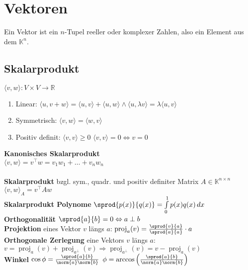 \documentclass[german, 6pt]{latex4ei/latex4ei_sheet}
\newcommand{\enbrace}[1]{\ensuremath{\left(#1\right)}}
\DeclareMathOperator{\proj}{proj}
\begin{document}
\section{Vektoren}
\begin{minipage}{\columnwidth}
Ein Vektor ist ein $n$-Tupel reeller oder komplexer Zahlen, also ein Element aus dem $\mathbb K^n$.
\subsection{Skalarprodukt}
$\langle v,w \rangle: V\times V \rightarrow \mathbb R$ 
	\begin{enumerate}\itemsep0pt
	\item Linear: $\langle u,v+w \rangle=\langle u,v \rangle + \langle u,w \rangle \land \langle u,\lambda v \rangle = \lambda \langle u, v \rangle$ 
	\item Symmetrisch: $\langle v,w \rangle=\langle w,v \rangle$
	\item Positiv definit: $\langle v,v \rangle\ge0$  \qquad $\langle v,v \rangle=0 \Leftrightarrow v=0$
	\end{enumerate} 
\textbf{Kanonisches Skalarprodukt} \\
$\langle v,w \rangle=v^\top  w=v_1w_1+\dots+v_nw_n$\\ \\
\textbf{Skalarprodukt} bzgl. sym., quadr. und positiv definiter Matrix $A\in \mathbb K^{n\times n}$\\
$\langle v,w \rangle_A=v^\top A w$\\
\textbf{Skalarprodukt Polynome} $\sprod{p(x)}{q(x)}=\int\limits_{0}^{1}p(x)q(x)\,dx$ \\
\textbf{Orthogonalität} $\sprod{a}{b} = 0 \Leftrightarrow a\perp b$ \\
\textbf{Projektion} eines Vektor $v$ längs $a$: $\proj_a(v) = \frac{\sprod{v}{a} }{\sprod{a}{a} }\cdot a$\\
\textbf{Orthogonale Zerlegung} eine Vektors $v$ längs $a$:\\ 
$v = \proj_a(v) + \proj_{a^\perp}(v) \Rightarrow \proj_{a^\perp}(v) = v - \proj_a(v)$\\
\textbf{Winkel} \quad 	$\cos \phi = \frac{\sprod{a}{b}}{\norm{a} \norm{b}} $ \qquad
$\phi = \arccos \enbrace{ \frac{\sprod{a}{b} }{\norm{a} \norm{b} } }$
\end{minipage}
\end{document}
